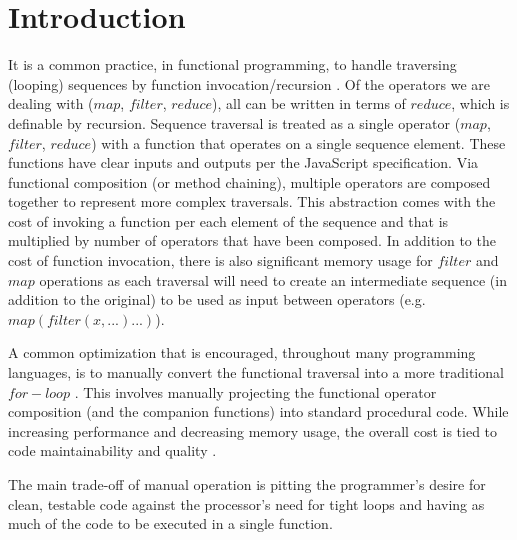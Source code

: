 \chapter{Introduction}
It is a common practice, in functional programming, to handle traversing (looping) sequences by function invocation/recursion \cite{recurse16}.  Of the operators we are dealing with ($map$, $filter$, $reduce$), all can be written in terms of $reduce$, which is definable by recursion. Sequence traversal is treated as a single operator ($map$, $filter$, $reduce$) with a function that operates on a single sequence element. These functions have clear inputs and outputs per the JavaScript specification.  Via functional composition (or method chaining), multiple operators are composed together to represent more complex traversals.  This abstraction comes with the cost of invoking a function per each element of the sequence and that is multiplied by number of operators that have been composed. In addition to the cost of function invocation, there is also significant memory usage for $filter$ and $map$ operations as each traversal will need to create an intermediate sequence (in addition to the original) to be used as input between operators (e.g. $map(filter(x, ...)...)$).  

A common optimization that is encouraged, throughout many programming languages, is to manually convert the functional traversal into a more traditional $for-loop$ \cite{iterperf09} \cite{iterperf10} \cite{iterperf11}.  This involves manually projecting the functional operator composition (and the companion functions) into standard procedural code.  While increasing performance and decreasing memory usage, the overall cost is tied to code maintainability and quality \cite{langstudy14}.  

The main trade-off of manual operation is pitting the programmer's desire for clean, testable code against the processor's need for tight loops and having as much of the code to be executed in a single function.  